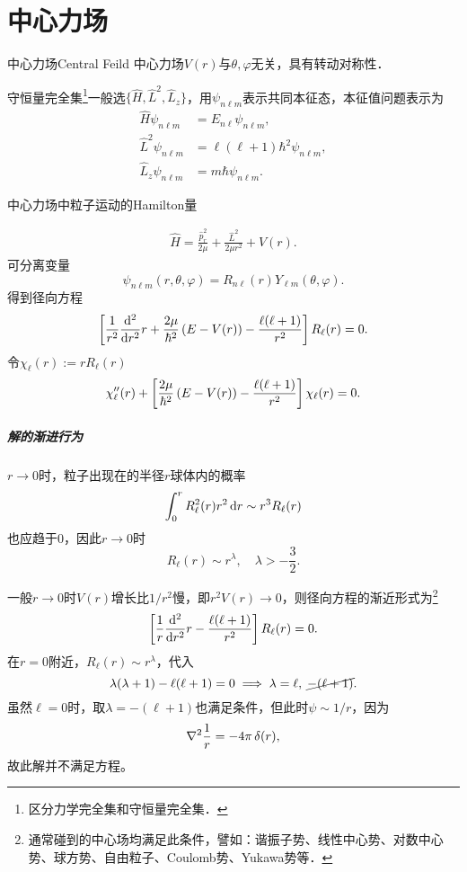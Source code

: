 \chapter{中心力场}
\begin{definition}{中心力场}{Central Feild}
	中心力场$V(r)$与$\theta,\varphi$无关，具有转动对称性．
\end{definition}
守恒量完全集\footnote{区分力学完全集和守恒量完全集．}一般选$\{\hat H,\hat L^2,\hat L_z\}$，用$\psi_{n\ell m}$表示共同本征态，本征值问题表示为
\begin{align*}
	\hat H\psi_{n\ell m}   & =E_{n\ell}\psi_{n\ell m},           \\
	\hat L^2\psi_{n\ell m} & =\ell(\ell+1)\hbar^2\psi_{n\ell m}, \\
	\hat L_z\psi_{n\ell m} & =m\hbar\psi_{n\ell m}.
\end{align*}

中心力场中粒子运动的Hamilton量
\iffalse
	\[
		\hat H=\frac{\hat p^2}{2\mu}+V(r)=-\frac{\hbar^2}{2\mu}\nabla^2+V(r).
\]
	球坐标系中
	\[
		\nabla^2=\frac1{r^2}\pp r\kh{r^2\pp r}+\frac1{r^2}\Lambda.
\]
	\nabla^2=\frac1{r^2}\pp r\kh{r^2\pp r}+\frac1{r^2\sin\theta}\pp \theta\kh{\sin\theta\pp \theta}+\frac1{r^2\sin^2\theta}\pd[2]{}\phi.
\]
	又径向动能算符
	\[
		\frac{\hat p_r^2}{2\mu}=-\frac{\hbar^2}{2\mu}\kh{\pp r+\frac1r}^2,
\]
	径向动量算符
	\[
		\hat L^2=-\hbar^2\Lambda.
\]
	因此Hamilton量可以写为
\fi
\begin{align}
	\hat H=\frac{\hat p_r^2}{2\mu}+\frac{\hat L^2}{2\mu r^2}+V(r).
\end{align}
可分离变量
\[
	\psi_{n\ell m}(r,\theta,\varphi)=R_{n\ell}(r)Y_{\ell m}(\theta,\varphi).
\]
得到径向方程
\begin{align}
	\fkh{\frac1{r^2}\dv[2]{}rr+\frac{2\mu}{\hbar^2}\kh{E-V(r)}-\frac{\ell(\ell+1)}{r^2}}R_\ell(r)=0.
\end{align}
令$\chi_\ell(r):=rR_\ell(r)$
\begin{align}
	\chi''_\ell(r)+\fkh{\frac{2\mu}{\hbar^2}\kh{E-V(r)}-\frac{\ell(\ell+1)}{r^2}}\chi_\ell(r)=0.
\end{align}
\paragraph{解的渐进行为}
$r\to0$时，粒子出现在的半径$r$球体内的概率
\[
	\int_0^rR_\ell^2(r)r^2\d r\sim r^3R_\ell(r)
\]
也应趋于0，因此$r\to0$时
\[
R_\ell(r)\sim r^\lambda,\quad\lambda>-\frac32.
\]

一般$r\to0$时$V(r)$增长比$1/r^2$慢，即$r^2V(r)\to0$，则径向方程的渐近形式为\footnote{通常碰到的中心场均满足此条件，譬如：谐振子势、线性中心势、对数中心势、球方势、自由粒子、Coulomb势、Yukawa势等．} %
\[
	\fkh{\frac1{r}\dd[2]rr-\frac{\ell(\ell+1)}{r^2}}R_\ell(r)=0.
\]
在$r=0$附近，$R_\ell(r)\sim r^\lambda$，代入
\[
	\lambda(\lambda+1)-\ell(\ell+1)=0\implies\lambda=\ell,\;\cancel{-(\ell+1)}.
\]
虽然$\ell=0$时，取$\lambda=-(\ell+1)$也满足条件，但此时$\psi\sim 1/r$，因为
\[
	\nabla^2\frac1r=-4\pi\vd(r),
\]
故此解并不满足\Schr 方程。
